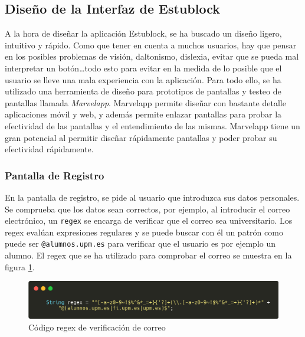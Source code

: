 \subsection{Diseño de la Interfaz de Estublock}

A la hora de diseñar la aplicación Estublock, se ha buscado un diseño ligero, intuitivo y rápido. Como que tener en cuenta a muchos usuarios, hay que pensar en los posibles problemas de visión, daltonismo, dislexia, evitar que se pueda mal interpretar un botón\dots todo esto para evitar en la medida de lo posible que el usuario se lleve una mala experiencia con la aplicación. Para todo ello, se ha utilizado una herramienta de diseño para prototipos de pantallas y testeo de pantallas llamada \emph{Marvelapp}\cite{marvelapp}. Marvelapp permite diseñar con bastante detalle aplicaciones móvil y web, y además permite enlazar pantallas para probar la efectividad de las pantallas y el entendimiento de las mismas. Marvelapp tiene un gran potencial al permitir diseñar rápidamente pantallas y poder probar su efectividad rápidamente. \\

\subsubsection{Pantalla de Registro}

En la pantalla de registro, se pide al usuario que introduzca sus datos personales. Se comprueba que los datos sean correctos, por ejemplo, al introducir el correo electrónico, un \verb|regex| se encarga de verificar que el correo sea universitario. Los regex evalúan expresiones regulares y se puede buscar con él un patrón como puede ser \verb|@alumnos.upm.es| para verificar que el usuario es por ejemplo un alumno. El regex que se ha utilizado para comprobar el correo se muestra en la figura \ref{fig:regex}. \\

\begin{figure}[h!]
  \centering
  \includegraphics[width=0.9\linewidth]{figs/Desarrollo/Codigo/regex}
  \caption[Código regex de verificación de correo]{Código regex de verificación de correo}
  \label{fig:regex}
\end{figure}

